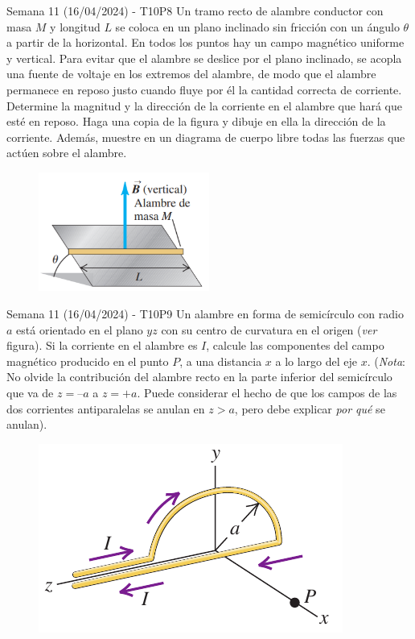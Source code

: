 \begin{frame}{Semana 11 (16/04/2024) - T10P8}
\small
    Un tramo recto de alambre conductor con masa $M$ y 
longitud $L$ se coloca en un plano
inclinado sin fricción con un
ángulo $\theta$ a partir de la horizontal. En todos los puntos hay un campo magnético 
uniforme y vertical. Para 
evitar que el alambre se deslice por el plano inclinado, se acopla una
fuente de voltaje en los extremos del alambre, de modo que el alambre
permanece en reposo justo cuando fluye por él la cantidad correcta 
de corriente. Determine la magnitud y la dirección de la corriente en 
el alambre que hará que esté en reposo. Haga una copia de la figura 
y dibuje en ella la dirección de la corriente. Además, muestre en un
diagrama de cuerpo libre todas las fuerzas que actúen sobre el alambre.

\begin{figure}
    \centering
    \includegraphics[width=0.5\textwidth]{figures/t10p8.png}
\end{figure}
    
\end{frame}

\begin{frame}{Semana 11 (16/04/2024) - T10P9}
    Un alambre en forma de semicírculo con radio $a$ está orientado en el plano $yz$
con su centro de curvatura en el
origen (\textit{ver} figura). Si la corriente en el alambre es $I$, calcule las componentes del campo magnético producido en el punto $P$, a una distancia $x$ a lo largo del eje $x$. (\textit{Nota}: No olvide la contribución del alambre recto en la parte
inferior del semicírculo que va de $z = –a$ a $z = +a$. Puede considerar
el hecho de que los campos de las dos corrientes antiparalelas se anulan en $z>a$, pero debe explicar \textit{por qué} se anulan).

\begin{figure}
        \centering
        \includegraphics[scale=0.4]{figures/t10p9.png}
    \end{figure}
        \end{frame}

